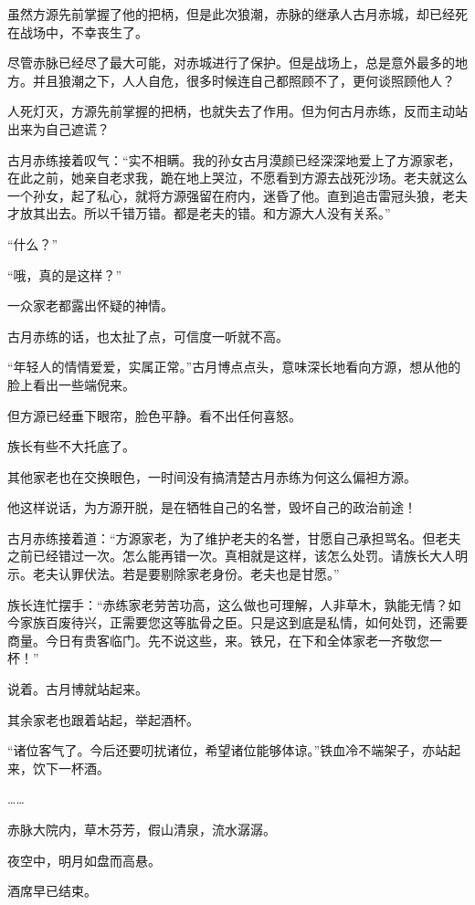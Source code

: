\begin{this_body}
虽然方源先前掌握了他的把柄，但是此次狼潮，赤脉的继承人古月赤城，却已经死在战场中，不幸丧生了。

尽管赤脉已经尽了最大可能，对赤城进行了保护。但是战场上，总是意外最多的地方。并且狼潮之下，人人自危，很多时候连自己都照顾不了，更何谈照顾他人？

人死灯灭，方源先前掌握的把柄，也就失去了作用。但为何古月赤练，反而主动站出来为自己遮谎？

古月赤练接着叹气：“实不相瞒。我的孙女古月漠颜已经深深地爱上了方源家老，在此之前，她亲自老求我，跪在地上哭泣，不愿看到方源去战死沙场。老夫就这么一个孙女，起了私心，就将方源强留在府内，迷昏了他。直到追击雷冠头狼，老夫才放其出去。所以千错万错。都是老夫的错。和方源大人没有关系。”

“什么？”

“哦，真的是这样？”

一众家老都露出怀疑的神情。

古月赤练的话，也太扯了点，可信度一听就不高。

“年轻人的情情爱爱，实属正常。”古月博点点头，意味深长地看向方源，想从他的脸上看出一些端倪来。

但方源已经垂下眼帘，脸色平静。看不出任何喜怒。

族长有些不大托底了。

其他家老也在交换眼色，一时间没有搞清楚古月赤练为何这么偏袒方源。

他这样说话，为方源开脱，是在牺牲自己的名誉，毁坏自己的政治前途！

古月赤练接着道：“方源家老，为了维护老夫的名誉，甘愿自己承担骂名。但老夫之前已经错过一次。怎么能再错一次。真相就是这样，该怎么处罚。请族长大人明示。老夫认罪伏法。若是要剔除家老身份。老夫也是甘愿。”

族长连忙摆手：“赤练家老劳苦功高，这么做也可理解，人非草木，孰能无情？如今家族百废待兴，正需要您这等肱骨之臣。只是这到底是私情，如何处罚，还需要商量。今日有贵客临门。先不说这些，来。铁兄，在下和全体家老一齐敬您一杯！”

说着。古月博就站起来。

其余家老也跟着站起，举起酒杯。

“诸位客气了。今后还要叨扰诸位，希望诸位能够体谅。”铁血冷不端架子，亦站起来，饮下一杯酒。

……

赤脉大院内，草木芬芳，假山清泉，流水潺潺。

夜空中，明月如盘而高悬。

酒席早已结束。


\end{this_body}
